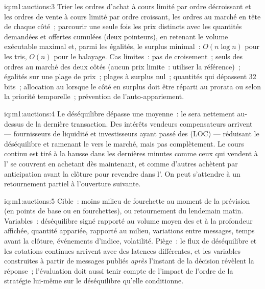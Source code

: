 \begin{solution}{iq:m1:auctions:3}
Trier les ordres d'achat à cours limité par ordre décroissant et les ordres de vente à cours limité par ordre croissant, les ordres au marché
en tête de chaque côté~; parcourir une seule fois les prix distincts avec les quantités demandées
et offertes cumulées (deux pointeurs), en retenant le volume exécutable maximal et, parmi les égalités,
le surplus minimal~: $O(n\log n)$ pour les tris, $O(n)$ pour le
balayage. Cas limites~: pas de croisement~; seuls des ordres au marché des deux côtés (aucun
prix limite~: utiliser la référence)~; égalités sur une plage de prix~; plages à surplus nul~;
quantités qui dépassent 32 bits~; allocation au  lorsque le côté
en surplus doit être réparti au prorata ou selon la priorité temporelle~; prévention de l'auto-appariement.
\end{solution}

\begin{solution}{iq:m1:auctions:4}
Le déséquilibre dépasse une  moyenne~: le  sera nettement au-dessus
de la dernière transaction. Des intérêts vendeurs compensateurs arrivent ---
fournisseurs de liquidité et investisseurs ayant passé des  (LOC) ---
réduisant le déséquilibre et ramenant le  vers le marché, mais
pas complètement. Le cours continu est tiré à la hausse dans les dernières minutes
comme ceux qui vendent à l' se couvrent en achetant dès maintenant, et comme d'autres achètent
par anticipation avant la clôture pour revendre dans l'. On peut s'attendre à un retournement partiel à l'ouverture suivante.
\end{solution}

\begin{solution}{iq:m1:auctions:5}
Cible~:  moins milieu de fourchette au moment de la prévision (en points de base ou
en fourchettes), ou retournement du lendemain matin. Variables~: déséquilibre signé rapporté
au volume moyen des  et à la profondeur affichée, quantité appariée, 
rapporté au milieu, variations entre messages, temps avant la clôture,
événements d'indice, volatilité. Piège~: le flux de déséquilibre et les cotations continues
arrivent avec des latences différentes, et les variables construites à partir de messages publiés
\emph{après} l'instant de la décision révèlent la réponse~; l'évaluation doit aussi tenir compte
de l'impact de l'ordre de la stratégie lui-même sur le déséquilibre qu'elle conditionne.
\end{solution}


